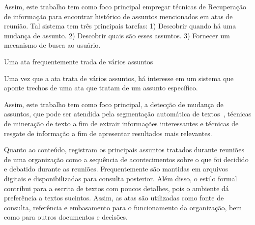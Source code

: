 







Assim, este trabalho tem como foco principal empregar técnicas de Recuperação de informação para encontrar histórico de assuntos mencionados em atas de reunião. Tal sistema tem três principais tarefas: 
1) Descobrir quando há uma mudança de assunto. 
2) Descobrir quais são esses assuntos. 
3) Fornecer um mecanismo de busca ao usuário. 



Uma ata frequentemente trada de vários assuntos

Uma vez que a ata trata de vários assuntos, 
há interesse em um sistema que aponte trechos de uma ata que tratam de um assunto específico. 

Assim, este trabalho tem como foco principal, a detecção de mudança de assuntos, que pode ser atendida pela segmentação automática de textos~\cite{Chen2017,Naili2016,Cardoso2017}, técnicas de mineração de texto a fim de extrair informações interessantes e técnicas de resgate de informação a fim de apresentar resultados mais relevantes. 



Quanto ao conteúdo, registram os principais assuntos tratados durante reuniões de uma organização como a sequência de acontecimentos sobre o que foi decidido e debatido durante as reuniões. Frequentemente são mantidas em arquivos digitais e disponibilizadas para consulta posterior.  Além disso, o estilo formal contribui para a escrita de textos com poucos detalhes, pois o ambiente dá preferência a textos sucintos.  Assim, as atas são utilizadas como fonte de consulta, referência e embasamento para o funcionamento da organização, bem como para outros documentos e decisões.




